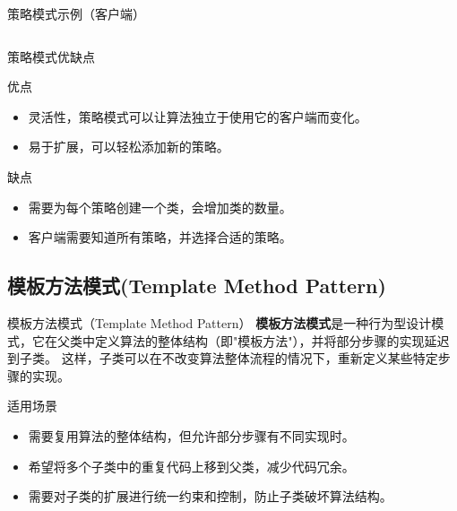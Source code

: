 \documentclass[UTF8,aspectratio=169]{beamer}
\begin{document}
\begin{frame}{策略模式示例（客户端）}
    \inputminted[firstline=74, lastline=90]{cpp}{code/strategy_pattern.cpp}
\end{frame}

\begin{frame}{策略模式优缺点}
    \begin{ytublock}{优点}
        \begin{itemize}
            \item 灵活性，策略模式可以让算法独立于使用它的客户端而变化。
            \item 易于扩展，可以轻松添加新的策略。
        \end{itemize}
    \end{ytublock}
    \begin{alertytublock}{缺点}
        \begin{itemize}
            \item 需要为每个策略创建一个类，会增加类的数量。
            \item 客户端需要知道所有策略，并选择合适的策略。
        \end{itemize}
    \end{alertytublock}
\end{frame}

\subsection{模板方法模式(Template Method Pattern)}

\begin{frame}{模板方法模式（Template Method Pattern）}
    \textbf{模板方法模式}是一种行为型设计模式，它在父类中定义算法的整体结构（即"模板方法"），并将部分步骤的实现延迟到子类。
    这样，子类可以在不改变算法整体流程的情况下，重新定义某些特定步骤的实现。

    \begin{ytublock}{适用场景}
        \begin{itemize}
            \item 需要复用算法的整体结构，但允许部分步骤有不同实现时。
            \item 希望将多个子类中的重复代码上移到父类，减少代码冗余。
            \item 需要对子类的扩展进行统一约束和控制，防止子类破坏算法结构。
        \end{itemize}
    \end{ytublock}
\end{frame}
\end{document}
